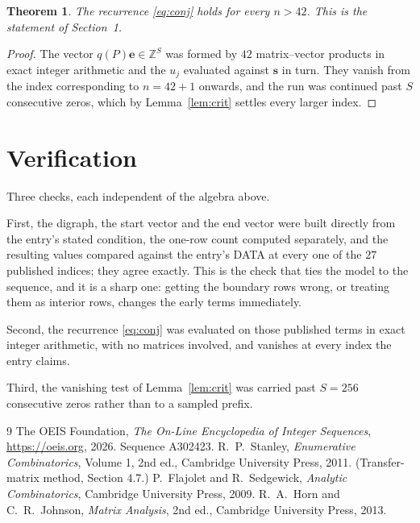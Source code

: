 \documentclass[11pt,a4paper]{article}
\theoremstyle{plain}
\newtheorem{theorem}{Theorem}
\theoremstyle{definition}
\begin{document}
\begin{theorem}
The recurrence \eqref{eq:conj} holds for every $n>42$. This is the statement of
Section~1.
\end{theorem}

\begin{proof}
The vector $q(P)\mathbf{e}\in\mathbb{Z}^{S}$ was formed by $42$ matrix--vector
products in exact integer arithmetic and the $u_j$ evaluated against $\mathbf{s}$ in turn.
They vanish from the index corresponding to $n=42+1$ onwards, and the run was continued
past $S$ consecutive zeros, which by Lemma~\ref{lem:crit} settles every larger index.
\end{proof}

\section{Verification}

Three checks, each independent of the algebra above.

First, the digraph, the start vector and the end vector were built directly from the
entry's stated condition, the one-row count computed separately, and the resulting values
compared against the entry's DATA at every one of the $27$ published indices; they
agree exactly. This is the check that ties the model to the sequence, and it is a sharp one:
getting the boundary rows wrong, or treating them as interior rows, changes the early terms
immediately.

Second, the recurrence \eqref{eq:conj} was evaluated on those published terms in exact
integer arithmetic, with no matrices involved, and vanishes at every index the entry claims.

Third, the vanishing test of Lemma~\ref{lem:crit} was carried past $S=256$ consecutive
zeros rather than to a sampled prefix.

\begin{thebibliography}{9}
 The OEIS Foundation, \emph{The On-Line Encyclopedia of Integer
Sequences}, \url{https://oeis.org}, 2026. Sequence A302423.
 R.~P.~Stanley, \emph{Enumerative Combinatorics}, Volume 1, 2nd ed.,
Cambridge University Press, 2011. (Transfer-matrix method, Section 4.7.)
 P.~Flajolet and R.~Sedgewick, \emph{Analytic Combinatorics}, Cambridge
University Press, 2009.
 R.~A.~Horn and C.~R.~Johnson, \emph{Matrix Analysis}, 2nd ed., Cambridge
University Press, 2013.
\end{thebibliography}
\end{document}
